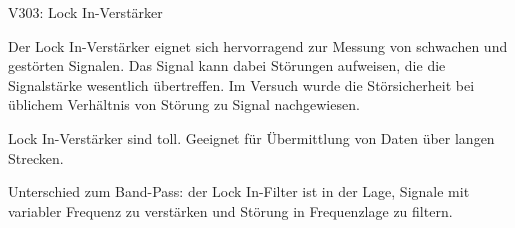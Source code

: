 \begin{Versuch}{V303: Lock In-Verstärker}
    \begin{Diskussion}
 		Der Lock In-Verstärker eignet sich hervorragend zur Messung von schwachen und gestörten Signalen. 
 		Das Signal kann dabei Störungen aufweisen, die die Signalstärke wesentlich übertreffen.
 		Im Versuch wurde die Störsicherheit bei üblichem Verhältnis von Störung zu Signal nachgewiesen.
    \end{Diskussion}

    \begin{Merke}
    	Lock In-Verstärker sind toll.
		Geeignet für Übermittlung von Daten über langen Strecken.

		Unterschied zum Band-Pass: der Lock In-Filter ist in der Lage, Signale mit variabler Frequenz zu verstärken und Störung in Frequenzlage zu filtern.
    \end{Merke}

    \end{Versuch}

